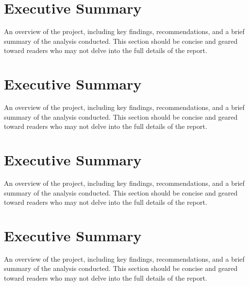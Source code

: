 \documentclass[a4paper,10pt]{article}
\begin{document}

\section{Executive Summary}

An overview of the project, including key findings, recommendations, and a brief summary of the analysis conducted. This section should be concise and geared toward readers who may not delve into the full details of the report. 

\section{Executive Summary}

An overview of the project, including key findings, recommendations, and a brief summary of the analysis conducted. This section should be concise and geared toward readers who may not delve into the full details of the report. 

\section{Executive Summary}

An overview of the project, including key findings, recommendations, and a brief summary of the analysis conducted. This section should be concise and geared toward readers who may not delve into the full details of the report. 

\section{Executive Summary}

An overview of the project, including key findings, recommendations, and a brief summary of the analysis conducted. This section should be concise and geared toward readers who may not delve into the full details of the report. 
\end{document}
